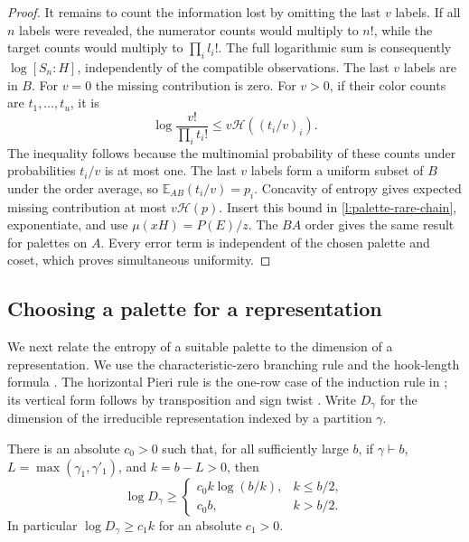 \begin{proof}
It remains to count the information lost by omitting the last $v$ labels.
If all $n$ labels were revealed, the numerator counts would multiply
to $n!$, while the target counts would multiply to $\prod_i l_i!$.
The full logarithmic sum is consequently $\log[S_n:H]$, independently
of the compatible observations.  The last $v$ labels are in $B$.
For $v=0$ the missing contribution is zero.  For $v>0$, if their color
counts are $t_1,\ldots,t_u$, it is
\[
 \log\frac{v!}{\prod_i t_i!}
 \le v\mathcal H((t_i/v)_i).
\]
The inequality follows because the multinomial probability
of these counts under probabilities $t_i/v$ is at most one.
The last $v$ labels form a uniform subset of $B$ under the order average,
so $\mathbb E_{AB}(t_i/v)=p_i$.  Concavity of entropy gives expected
missing contribution at most $v\mathcal H(p)$.  Insert this bound in
\eqref{l:palette-rare-chain}, exponentiate, and use
$\mu(xH)=P(E)/z$.  The $BA$ order gives the same result for palettes on
$A$.  Every error term is independent of the chosen palette and coset,
which proves simultaneous uniformity.
\end{proof}

\subsection{Choosing a palette for a representation}

We next relate the entropy of a suitable palette to the dimension of a
representation.  We use the characteristic-zero branching rule
\cite[Theorem~9.2]{James1978} and the hook-length formula
\cite[Theorem~4.53]{etingof}.  The horizontal Pieri rule is the one-row
case of the induction rule in \cite[Section~16]{James1978}; its vertical
form follows by transposition and sign twist
\cite[Theorem~6.7]{James1978}.  Write $D_\gamma$ for the dimension of
the irreducible representation indexed by a partition $\gamma$.

\begin{lemma}
There is an absolute $c_0>0$ such that, for all sufficiently large $b$,
\label{l:palette-degree}
if $\gamma\vdash b$, $L=\max(\gamma_1,\gamma'_1)$, and $k=b-L>0$,
then
\begin{equation}
 \log D_\gamma\ge
 \begin{cases}
 c_0 k\log(b/k),&k\le b/2,\\
 c_0 b,&k>b/2.
 \end{cases}
 \label{l:palette-degree-bound}
\end{equation}
In particular $\log D_\gamma\ge c_1k$ for an absolute $c_1>0$.
\end{lemma}


